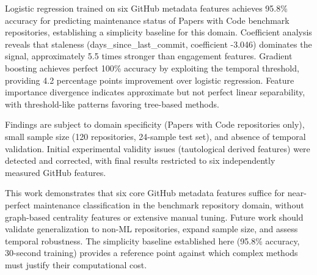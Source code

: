 
Logistic regression trained on six GitHub metadata features achieves 95.8\% accuracy for predicting maintenance status of Papers with Code benchmark repositories, establishing a simplicity baseline for this domain. Coefficient analysis reveals that staleness (days\_since\_last\_commit, coefficient -3.046) dominates the signal, approximately 5.5 times stronger than engagement features. Gradient boosting achieves perfect 100\% accuracy by exploiting the temporal threshold, providing 4.2 percentage points improvement over logistic regression. Feature importance divergence indicates approximate but not perfect linear separability, with threshold-like patterns favoring tree-based methods.

Findings are subject to domain specificity (Papers with Code repositories only), small sample size (120 repositories, 24-sample test set), and absence of temporal validation. Initial experimental validity issues (tautological derived features) were detected and corrected, with final results restricted to six independently measured GitHub features.

This work demonstrates that six core GitHub metadata features suffice for near-perfect maintenance classification in the benchmark repository domain, without graph-based centrality features or extensive manual tuning. Future work should validate generalization to non-ML repositories, expand sample size, and assess temporal robustness. The simplicity baseline established here (95.8\% accuracy, 30-second training) provides a reference point against which complex methods must justify their computational cost.
